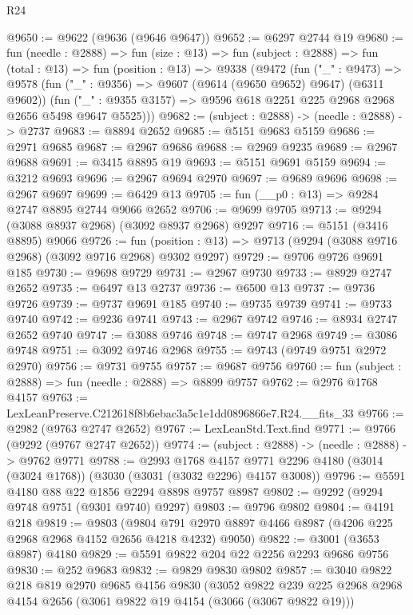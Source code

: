 \begin{lexlean}{R24}
\begin{coremodule}
@9650 := @9622 (@9636 (@9646 @9647))
@9652 := @6297 @2744 @19
@9680 := fun (needle : @2888) =>
  fun (size : @13) =>
  fun (subject : @2888) =>
  fun (total : @13) =>
  fun (position : @13) =>
  @9338
    (@9472
      (fun ("_" : @9473) =>
      @9578
        (fun ("_" : @9356) => @9607 (@9614 (@9650 @9652) @9647) (@6311 @9602))
        (fun ("_" : @9355 @3157) => @9596 @618 @2251 @225 @2968 @2968 @2656 @5498 @9647 @5525)))
@9682 := (subject : @2888) -> (needle : @2888) -> @2737
@9683 := @8894 @2652
@9685 := @5151 @9683 @5159
@9686 := @2971 @9685
@9687 := @2967 @9686
@9688 := @2969 @9235
@9689 := @2967 @9688
@9691 := @3415 @8895 @19
@9693 := @5151 @9691 @5159
@9694 := @3212 @9693
@9696 := @2967 @9694 @2970
@9697 := @9689 @9696
@9698 := @2967 @9697
@9699 := @6429 @13
@9705 := fun (__p0 : @13) => @9284 @2747 @8895 @2744 @9066 @2652
@9706 := @9699 @9705
@9713 := @9294 (@3088 @8937 @2968) (@3092 @8937 @2968) @9297
@9716 := @5151 (@3416 @8895) @9066
@9726 := fun (position : @13) => @9713 (@9294 (@3088 @9716 @2968) (@3092 @9716 @2968) @9302 @9297)
@9729 := @9706 @9726 @9691 @185
@9730 := @9698 @9729
@9731 := @2967 @9730
@9733 := @8929 @2747 @2652
@9735 := @6497 @13 @2737
@9736 := @6500 @13
@9737 := @9736 @9726
@9739 := @9737 @9691 @185
@9740 := @9735 @9739
@9741 := @9733 @9740
@9742 := @9236 @9741
@9743 := @2967 @9742
@9746 := @8934 @2747 @2652 @9740
@9747 := @3088 @9746
@9748 := @9747 @2968
@9749 := @3086 @9748
@9751 := @3092 @9746 @2968
@9755 := @9743 (@9749 @9751 @2972 @2970)
@9756 := @9731 @9755
@9757 := @9687 @9756
@9760 := fun (subject : @2888) => fun (needle : @2888) => @8899 @9757
@9762 := @2976 @1768 @4157
@9763 := LexLeanPreserve.C212618f8b6ebac3a5c1e1dd0896866e7.R24.__fits_33
@9766 := @2982 (@9763 @2747 @2652)
@9767 := LexLeanStd.Text.find
@9771 := @9766 (@9292 (@9767 @2747 @2652))
@9774 := (subject : @2888) -> (needle : @2888) -> @9762 @9771
@9788 := @2993
    @1768
    @4157
    @9771
    @2296
    @4180
    (@3014 (@3024 @1768))
    (@3030 (@3031 (@3032 @2296) @4157 @3008))
@9796 := @5591 @4180 @88 @22 @1856 @2294 @8898 @9757 @8987
@9802 := @9292 (@9294 @9748 @9751 (@9301 @9740) @9297)
@9803 := @9796 @9802
@9804 := @4191 @218
@9819 := @9803
    (@9804 @791 @2970 @8897 @4466 @8987 (@4206 @225 @2968 @2968 @4152 @2656 @4218 @4232) @9050)
@9822 := @3001 (@3653 @8987) @4180
@9829 := @5591 @9822 @204 @22 @2256 @2293 @9686 @9756
@9830 := @252 @9683
@9832 := @9829 @9830 @9802
@9857 := @3040
    @9822
    @218
    @819
    @2970
    @9685
    @4156
    @9830
    (@3052
      @9822
      @239
      @225
      @2968
      @2968
      @4154
      @2656
      (@3061 @9822 @19 @4154 (@3066 (@3067 @9822 @19)))

\end{coremodule}
\end{lexlean}
